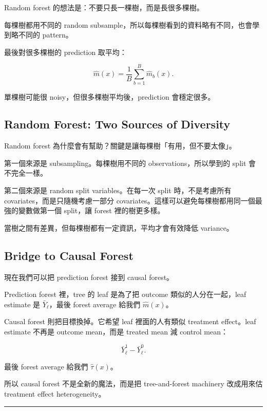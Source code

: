 \documentclass[
  chinese,
  11pt,
]{article}
\begin{document}
Random forest 的想法是：不要只長一棵樹，而是長很多棵樹。

每棵樹都用不同的 random
subsample，所以每棵樹看到的資料略有不同，也會學到略不同的 pattern。

最後對很多棵樹的 prediction 取平均：

\[
\hat{m}(x)=\frac{1}{B}\sum_{b=1}^B \hat{m}_b(x).
\]

單棵樹可能很 noisy，但很多棵樹平均後，prediction 會穩定很多。

\subsection{Random Forest: Two Sources of
Diversity}\label{random-forest-two-sources-of-diversity}

Random forest 為什麼會有幫助？關鍵是讓每棵樹「有用，但不要太像」。

第一個來源是 subsampling。每棵樹用不同的 observations，所以學到的 split
會不完全一樣。

第二個來源是 random split variables。在每一次 split 時，不是考慮所有
covariates，而是只隨機考慮一部分
covariates。這樣可以避免每棵樹都用同一個最強的變數做第一個 split，讓
forest 裡的樹更多樣。

當樹之間有差異，但每棵樹都有一定資訊，平均才會有效降低 variance。

\subsection{Bridge to Causal Forest}\label{bridge-to-causal-forest}

現在我們可以把 prediction forest 接到 causal forest。

Prediction forest 裡，tree 的 leaf 是為了把 outcome
類似的人分在一起，leaf estimate 是 \(\bar{Y}_{\ell}\)，最後 forest
average 給我們 \(\hat{m}(x)\)。

Causal forest 則把目標換掉。它希望 leaf 裡面的人有類似 treatment
effect。leaf estimate 不再是 outcome mean，而是 treated mean 減 control
mean：

\[
\bar{Y}^{1}_{\ell}-\bar{Y}^{0}_{\ell}.
\]

最後 forest average 給我們 \(\hat{\tau}(x)\)。

所以 causal forest 不是全新的魔法，而是把 tree-and-forest machinery
改成用來估 treatment effect heterogeneity。

\begin{center}\rule{0.5\linewidth}{0.5pt}\end{center}
\end{document}
